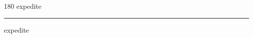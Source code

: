 
\begin{frame}
\begin{center}
\begin{turn}{180}
{\fontsize{2.5cm}{1em}\selectfont expedite}
\end{turn}
\vspace{1em}\par  
\hrule
\vspace{1em}\par  
{\fontsize{2.5cm}{1em}\selectfont expedite}
\end{center}
\end{frame}
